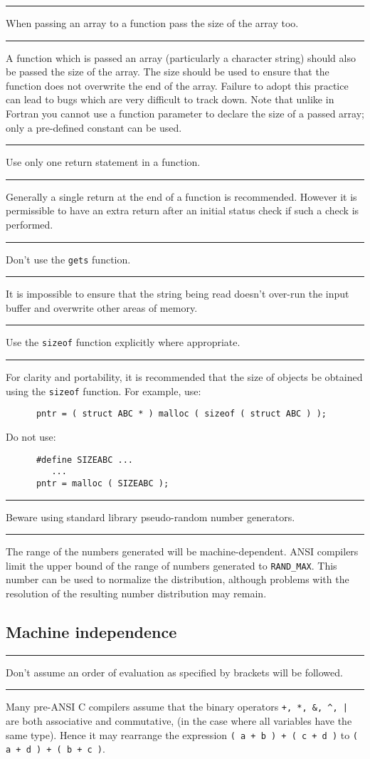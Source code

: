 \documentclass[twoside,11pt]{article}
\newcounter{sruleno}
\newcommand{\srule}[1]{
    \addtocounter{sruleno}{1}
    \goodbreak
    \rule[0.5ex]{\textwidth}{0.3mm}
    {\Large #1 \hfill {\thesruleno}}
    \rule[0.5ex]{\textwidth}{0.1mm}
}
\newcommand{\srule}[1]{
       \addtocounter{sruleno}{1}
       \begin{rawhtml} <HR> \end{rawhtml}
       {\Large \thesruleno}~~~~{\Large #1}
       \begin{rawhtml} <HR> \end{rawhtml}
       \end{tabular}
  }
\begin{document}
\srule{When passing an array to a function pass the size of the array
too.}
A function which is passed an array (particularly a
character string) should also be passed the size of the array.
The size should be used to ensure that the function does not overwrite the
end of the array.
Failure to adopt this practice can lead to bugs which are very difficult to
track down.  Note that unlike in Fortran you cannot use a function parameter
to declare the size of a passed array; only a pre-defined constant can be used.


\srule{Use only one return statement in a function.}
Generally a single return at the end of a function is recommended.
However it is permissible to have an extra return after
an initial status check if such a check is performed.


\srule{Don't use the {\tt gets} function.}
It is impossible to ensure that the string being
read doesn't over-run the input buffer and overwrite other areas of memory.

\srule{Use the {\tt sizeof} function explicitly where appropriate.}
For clarity and portability, it is recommended that the size of objects be
obtained using the \verb~sizeof~ function.
For example, use:
\begin{verbatim}
      pntr = ( struct ABC * ) malloc ( sizeof ( struct ABC ) );
\end{verbatim}

Do not use:
\begin{verbatim}
      #define SIZEABC ...
         ...
      pntr = malloc ( SIZEABC );
\end{verbatim}


\srule{Beware using standard library pseudo-random number generators.}
The range of the numbers generated will be machine-dependent.
ANSI compilers limit the upper bound of the range of numbers generated to
{\tt RAND\_MAX}.
This number can be used to normalize the distribution, although
problems with the resolution of the resulting number distribution may remain.


\subsection{Machine independence}


\srule{Don't assume an order of evaluation as specified by brackets
will be followed.}
Many pre-ANSI C compilers assume that the binary operators
\verb~+, *, &, ^, |~
are both associative and commutative, (in the case where all variables have
the same type).
Hence it may rearrange the expression
{\tt ( a + b ) + ( c + d )} to {\tt ( a + d ) + ( b + c )}.
\end{document}
